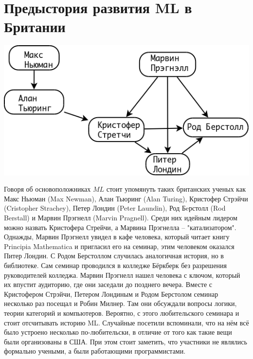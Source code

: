 \documentclass[14pt]{matmex-diploma-custom}
\begin{document}
\section{Предыстория развития ML в Британии}
\includegraphics[angle=0,scale=0.4]{british.png}

Говоря об основоположниках $M\!L$ стоит упомянуть таких британских ученых как Макс Ньюман (Max Newman), Алан Тьюринг (Alan Turing), Кристофер Стрэйчи (Cristopher Strachey), Петер Лондин (Peter Laundin), Род Бeрстолл (Rod Berstall) и Марвин Прэгнелл (Marvin Pragnell). Среди них идейным лидером можно назвать Кристофера Стрейчи, а Марвина Прэгнелла -- "катализатором". Однажды, Марвин Прэгнелл увидел в кафе человека, который читает книгу Principia Mathematica \cite{russel1} и пригласил его на семинар, этим человеком оказался Питер Лондин. С Родом Берстоллом случилась аналогичная история, но в библиотеке. Сам семинар проводился в колледже Бёркберк без разрешения руководителей колледжа. Марвин Прэгнелл нашел человека с ключом, который их впустит аудиторию, где они заседали до позднего вечера. Вместе с Кристофером Стрэйчи, Петером Лондиным и Родом Берстолом семинар несколько раз посещал и Робин Милнер. Там они обсуждали вопросы логики, теории категорий и компьютеров. Вероятно, с этого любительского семинара и стоит отсчитывать историю ML. Случайные посетили вспоминали, что на нём всё было устроено несколько по-любительски, в отличие от того как такие вещи были организованы в США. При этом стоит заметить, что участники не являлись формально учеными, а были работающими программистами.
\end{document}
